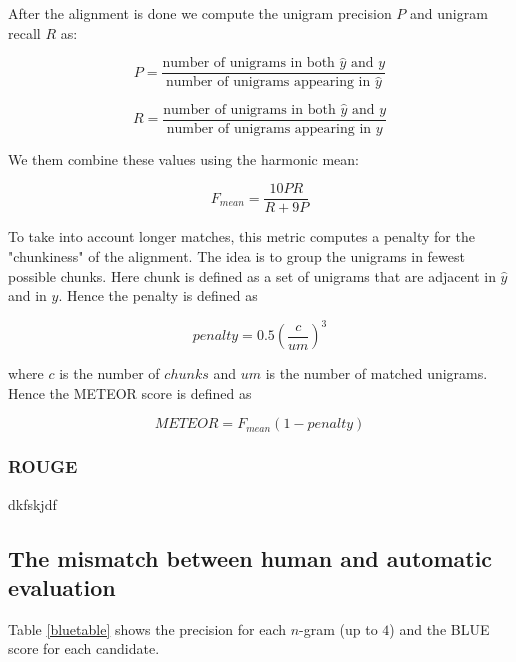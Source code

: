 After the alignment is done we compute the unigram precision $P$ and unigram recall $R$ as:

\begin{equation*}
P = \frac{\text{number of } \text{unigrams in both } \hat{y} \text{ and } y}{\text{number of } \text{unigrams appearing in } \hat{y}}
\end{equation*}    


\begin{equation*}
R = \frac{\text{number of } \text{unigrams in both } \hat{y} \text{ and } y}{\text{number of } \text{unigrams appearing in } y}
\end{equation*}    

We them combine these values using the harmonic mean:

\begin{equation*}
F_{mean} = \frac{10 P R}{R + 9P}
\end{equation*}

To take into account longer matches, this metric computes a penalty for the "chunkiness" of the alignment. The idea is to group the unigrams in fewest possible chunks. Here chunk is defined as a set of unigrams that are adjacent in $\hat{y}$ and in $y$. Hence the penalty is defined as

\begin{equation*}
penalty = 0.5 \left( \frac{c}{um} \right)^{3}
\end{equation*}

where $c$ is the number of $chunks$ and $um$ is the number of matched unigrams. Hence the METEOR score is defined as

\begin{equation*}
METEOR = F_{mean} (1 - penalty)
\end{equation*}

\subsubsection{ROUGE}

dkfskjdf


\subsection{The mismatch between human and automatic evaluation}



Table \ref{bluetable} shows the precision for each $n$-gram (up to $4$) and the BLUE score for each candidate.


